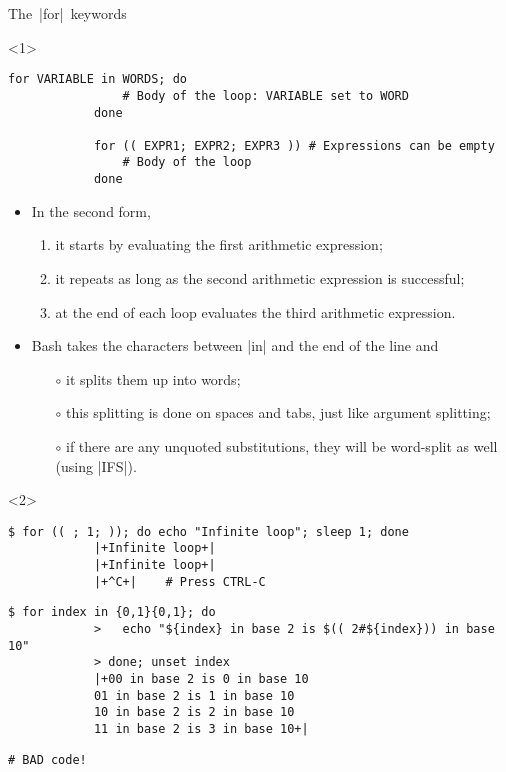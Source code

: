 \begin{frame}[fragile]{The \,\bash|for|\, keywords}
    \begin{onlyenv}<1>
        \begin{lstlisting}[style=MyBash, numbers=none]
            for VARIABLE in WORDS; do
                # Body of the loop: VARIABLE set to WORD
            done

            for (( EXPR1; EXPR2; EXPR3 )) # Expressions can be empty
                # Body of the loop
            done
        \end{lstlisting}
        \bigskip
        \begin{itemize}
            \item In the second form,
                  \begin{enumerate}
                      \item it starts by evaluating the first arithmetic expression;
                      \item it repeats as long as the second arithmetic expression is successful;
                      \item at the end of each loop evaluates the third arithmetic expression.
                  \end{enumerate}
            \item Bash takes the characters between \bash|in| and the end of the line and
                  \begin{itemize}
                      \item[$\circ$] it splits them up into words;
                      \item[$\circ$] this splitting is done on spaces and tabs, just like argument splitting;
                      \item[$\circ$] if there are any unquoted substitutions, \alert{they will be word-split as well} (using \bash|IFS|).
                  \end{itemize}
        \end{itemize}
    \end{onlyenv}
    \begin{onlyenv}<2>
        \begin{lstlisting}[style=MyBash, xrightmargin=4mm]
            $ for (( ; 1; )); do echo "Infinite loop"; sleep 1; done
            |+Infinite loop+|
            |+Infinite loop+|
            |+^C+|    # Press CTRL-C
        \end{lstlisting}
        \medskip
        \begin{lstlisting}[style=MyBash, xrightmargin=4mm]
            $ for index in {0,1}{0,1}; do
            >   echo "${index} in base 2 is $(( 2#${index})) in base 10"
            > done; unset index
            |+00 in base 2 is 0 in base 10
            01 in base 2 is 1 in base 10
            10 in base 2 is 2 in base 10
            11 in base 2 is 3 in base 10+|
        \end{lstlisting}
        \medskip
        \begin{lstlisting}[style=MyBash, xrightmargin=4mm]
            # BAD code!


\end{lstlisting}
\end{onlyenv}
\end{frame}
